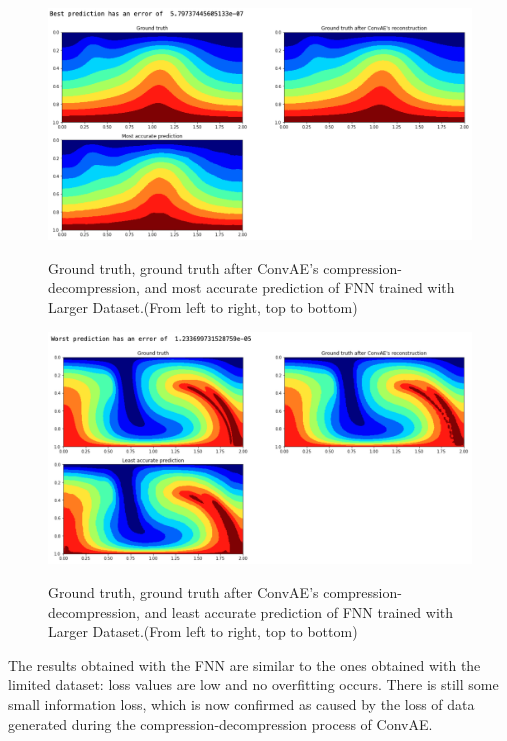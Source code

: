 \begin{figure}[H]
    \caption{Ground truth, ground truth after ConvAE's compression-decompression, and most accurate prediction of FNN trained with Larger Dataset.(From left to right, top to bottom)}
    \includegraphics[scale=0.5]{figures/mantle_convection_images/larger_dataset/FNN_Best.png}
    \label{figure:FNN_larger_best}
\end{figure}

\begin{figure}[H]
    \caption{Ground truth, ground truth after ConvAE's compression-decompression, and least accurate prediction of FNN trained with Larger Dataset.(From left to right, top to bottom)}
    \includegraphics[scale=0.5]{figures/mantle_convection_images/larger_dataset/FNN_Worst.png}
    \label{figure:FNN_larger_worst}
\end{figure}

The results obtained with the FNN are similar to the ones obtained with the limited dataset: loss values are low and no overfitting occurs. There is still some small information loss, which is now confirmed as caused by the loss of data generated during the compression-decompression process of ConvAE.

